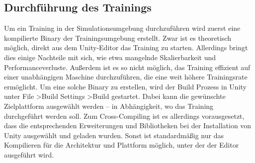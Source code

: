 \subsection{Durchführung des Trainings}
Um ein Training in der Simulationsumgebung durchzuführen wird zuerst eine kompilierte Binary der Trainingsumgebung erstellt.
Zwar ist es theoretisch möglich, direkt aus dem Unity-Editor das Training zu starten.
Allerdings bringt dies einige Nachteile mit sich, wie etwa mangelnde Skalierbarkeit und Performanceverluste.
Außerdem ist es so nicht möglich, das Training effizient auf einer unabhängigen Maschine durchzuführen, die eine weit höhere Trainingsrate ermöglicht.
Um eine solche Binary zu erstellen, wird der Build Prozess in Unity unter File \textgreater Build Settings \textgreater Build gestartet.
Dabei kann die gewünschte Zielplattform ausgewählt werden -- in Abhängigkeit, wo das Training durchgeführt werden soll.
Zum Cross-Compiling ist es allerdings vorausgesetzt, dass die entsprechenden Erweiterungen und Bibliotheken bei der Installation von Unity ausgewählt und geladen wurden.
Sonst ist standardmäßig nur das Kompilieren für die Architektur und Plattform möglich, unter der der Editor ausgeführt wird.

